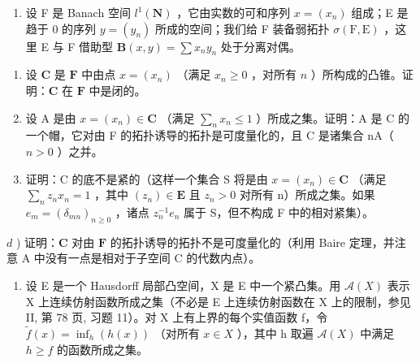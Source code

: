 \begin{enumerate}
\def\labelenumi{\arabic{enumi})}
\setcounter{enumi}{36}
\tightlist
\item
  设 F 是 Banach 空间 \(l^{1}(\mathbf{N})\) ，它由实数的可和序列 \(x = (x_{n})\) 组成；E 是趋于 0 的序列 \(y = (y_{n})\) 所成的空间；我们给 F 装备弱拓扑 \(\sigma(\mathrm{F}, \mathrm{E})\) ，这里 E 与 F 借助型 \(\mathbf{B}(x, y) = \sum x_{n} y_{n}\) 处于分离对偶。
\end{enumerate}

\begin{enumerate}
\def\labelenumi{\alph{enumi})}
\item
  设 \(\mathbf{C}\) 是 \(\mathbf{F}\) 中由点 \(x = (x_{n})\) （满足 \(x_{n} \geqslant 0\) ，对所有 \(n\) ）所构成的凸锥。证明：\(\mathbf{C}\) 在 \(\mathbf{F}\) 中是闭的。
\item
  设 A 是由 \(x = (x_{n}) \in \mathbf{C}\) （满足 \(\sum_{n} x_{n} \leqslant 1\) ）所成之集。证明：A 是 C 的一个帽，它对由 F 的拓扑诱导的拓扑是可度量化的，且 C 是诸集合 nA（\(n > 0\) ）之并。
\item
  证明：C 的底不是紧的（这样一个集合 S 将是由 \(x = (x_{n}) \in \mathbf{C}\) （满足 \(\sum_{n} z_{n} x_{n} = 1\) ，其中 \((z_{n}) \in \mathbf{E}\) 且 \(z_{n} > 0\) 对所有 n）所成之集。如果 \(e_{m} = (\delta_{mn})_{n \geqslant 0}\) ，诸点 \(z_{n}^{-1} e_{n}\) 属于 S，但不构成 F 中的相对紧集）。
\end{enumerate}

\(d\) ) 证明：\(\mathbf{C}\) 对由 \(\mathbf{F}\) 的拓扑诱导的拓扑不是可度量化的（利用 Baire 定理，并注意 A 中没有一点是相对于子空间 C 的代数内点）。

\begin{enumerate}
\def\labelenumi{\arabic{enumi})}
\setcounter{enumi}{37}
\tightlist
\item
  设 E 是一个 Hausdorff 局部凸空间，X 是 E 中一个紧凸集。用 \(\mathcal{A}(X)\) 表示 X 上连续仿射函数所成之集（不必是 E 上连续仿射函数在 X 上的限制，参见 II, 第 78 页, 习题 11）。对 X 上有上界的每个实值函数 f，令 \(\tilde{f}(x) = \inf_{h}(h(x))\) （对所有 \(x \in X\) ），其中 h 取遍 \(\mathcal{A}(X)\) 中满足 \(h \geqslant f\) 的函数所成之集。
\end{enumerate}

